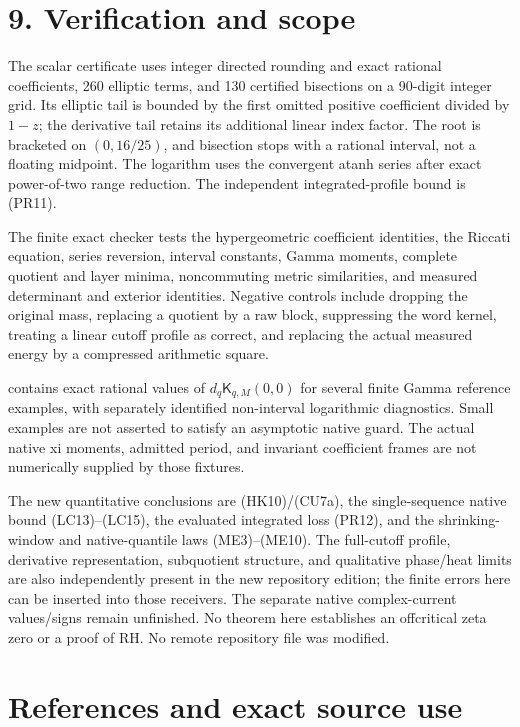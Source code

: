 \documentclass[10pt]{article}
\begin{document}
\section{9. Verification and scope}\label{verification-and-scope}

The scalar certificate uses integer directed rounding and exact rational coefficients, 260 elliptic terms, and 130 certified bisections on a 90-digit integer grid. Its elliptic tail is bounded by the first omitted positive coefficient divided by \(1-z\); the derivative tail retains its additional linear index factor. The root is bracketed on \((0,16/25)\), and bisection stops with a rational interval, not a floating midpoint. The logarithm uses the convergent atanh series after exact power-of-two range reduction. The independent integrated-profile bound is (PR11).

The finite exact checker tests the hypergeometric coefficient identities, the Riccati equation, series reversion, interval constants, Gamma moments, complete quotient and layer minima, noncommuting metric similarities, and measured determinant and exterior identities. Negative controls include dropping the original mass, replacing a quotient by a raw block, suppressing the word kernel, treating a linear cutoff profile as correct, and replacing the actual measured energy by a compressed arithmetic square.

 contains exact rational values of \(d_q\mathsf K_{q,M}(0,0)\) for several finite Gamma reference examples, with separately identified non-interval logarithmic diagnostics. Small examples are not asserted to satisfy an asymptotic native guard. The actual native xi moments, admitted period, and invariant coefficient frames are not numerically supplied by those fixtures.

The new quantitative conclusions are (HK10)/(CU7a), the single-sequence native bound (LC13)--(LC15), the evaluated integrated loss (PR12), and the shrinking-window and native-quantile laws (ME3)--(ME10). The full-cutoff profile, derivative representation, subquotient structure, and qualitative phase/heat limits are also independently present in the new repository edition; the finite errors here can be inserted into those receivers. The separate native complex-current values/signs remain unfinished. No theorem here establishes an offcritical zeta zero or a proof of RH. No remote repository file was modified.

\section{References and exact source use}\label{references-and-exact-source-use}
\end{document}
